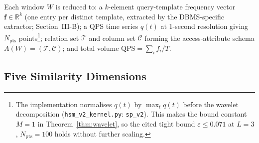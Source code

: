 \documentclass[10pt,journal,compsoc]{IEEEtran}
\newcommand{\Npts}{N_{\mathrm{pts}}}
\begin{document}
Each window $W$ is reduced to: a $k$-element query-template frequency
vector $\mathbf{f}\!\in\!\mathbb{R}^k$ (one entry per distinct template,
extracted by the DBMS-specific extractor; Section~III-B); a QPS time
series $q(t)$ at 1-second resolution giving $\Npts$ points\footnote{The
implementation normalises $q(t)$ by $\max_t q(t)$ before the wavelet
decomposition (\texttt{hsm\_v2\_kernel.py}: \texttt{sp\_v2}). This makes
the bound constant $M\!=\!1$ in Theorem~\ref{thm:wavelet}, so the cited
tight bound $\varepsilon\!\le\!0.071$ at $L\!=\!3$, $\Npts\!=\!100$
holds without further scaling.}; relation set
$\mathcal{T}$ and column set $\mathcal{C}$ forming the access-attribute
schema $A(W)\!=\!(\mathcal{T},\mathcal{C})$; and total volume
$\mathrm{QPS}\!=\!\sum_i f_i/T$.

\subsection{Five Similarity Dimensions}
\end{document}
